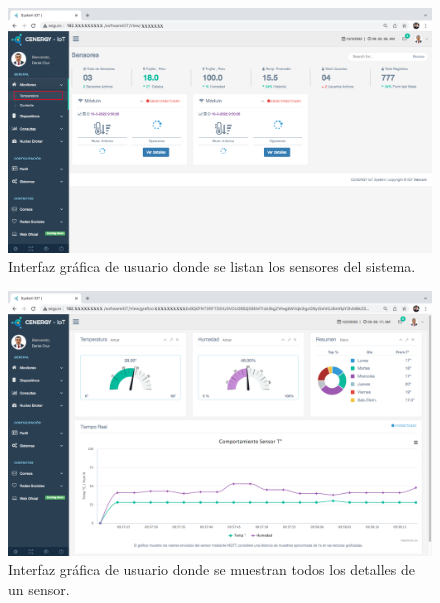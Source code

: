 
\begin{landscape} %
\begin{figure}[htpb]
\centering 
\includegraphics[width=1.55\textwidth]{./Figures/gui/2.png}
\caption{Interfaz gráfica de usuario donde se listan los sensores del sistema.}
\label{fig:gui2}
\end{figure}
\end{landscape} %


\begin{landscape} %
\begin{figure}[htpb]
\centering 
\includegraphics[width=1.5\textwidth]{./Figures/gui/2-1.png}
\caption{Interfaz gráfica de usuario donde se muestran todos los detalles de un sensor.}
\label{fig:gui2-1}
\end{figure}
\end{landscape} %


